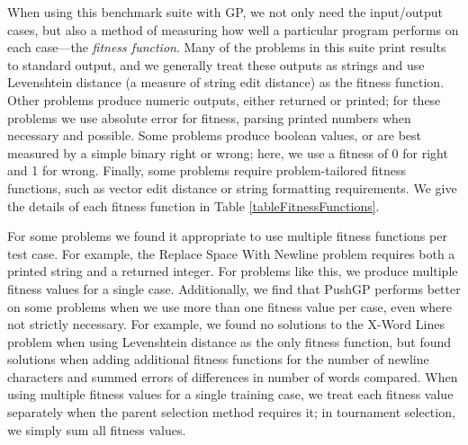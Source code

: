 \documentclass{sig-alternate}
\begin{document}
When using this benchmark suite with GP, we not only need the input/output cases, but also a method of measuring how well a particular program performs on each case---the \textit{fitness function}. 
Many of the problems in this suite print results to standard output, and we generally treat these outputs as strings and use Levenshtein distance (a measure of string edit distance) as the fitness function. Other problems produce numeric outputs, either returned or printed; for these problems we use absolute error for fitness, parsing printed numbers when necessary and possible. Some problems produce boolean values, or are best measured by a simple binary right or wrong; here, we use a fitness of 0 for right and 1 for wrong. Finally, some problems require problem-tailored fitness functions, such as vector edit distance or string formatting requirements. We give the details of each fitness function in Table \ref{tableFitnessFunctions}.

For some problems we found it appropriate to use multiple fitness functions per test case. For example, the Replace Space With Newline problem requires both a printed string and a returned integer. For problems like this, we produce multiple fitness values for a single case. Additionally, we find that PushGP performs better on some problems when we use more than one fitness value per case, even where not strictly necessary. For example, we found no solutions to the X-Word Lines problem when using Levenshtein distance as the only fitness function, but found solutions when adding additional fitness functions for the number of newline characters and summed errors of differences in number of words compared. When using multiple fitness values for a single training case, we treat each fitness value separately when the parent selection method requires it; in tournament selection, we simply sum all fitness values.
\end{document}
